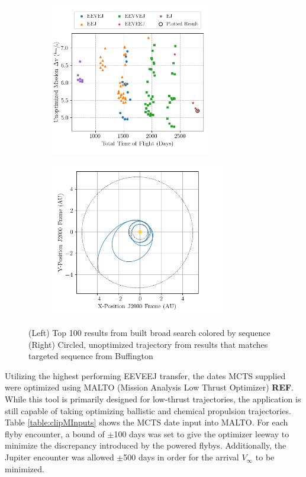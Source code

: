 \documentclass[letterpaper, preprint, paper,11pt]{AAS}	%
\begin{document}
\begin{figure}[htb]
    \begin{subfigure}
        \centering\includegraphics[width=2.75in]{./fig/clipperResults.png}
    \end{subfigure}
    \begin{subfigure}
        \centering\includegraphics[width=3in]{./fig/clipperMCTS.png}
    \end{subfigure}
    \caption{(Left) Top 100 results from built broad search colored by sequence\hspace{1em} (Right) Circled, unoptimized trajectory from results that matches targeted sequence from Buffington \cite{Buffington2014}}
    \label{fig:clipResults}
\end{figure}

Utilizing the highest performing EEVEEJ transfer, the dates MCTS supplied were optimized using MALTO (Mission Analysis Low Thrust Optimizer) \textbf{REF}. While this tool is primarily designed for low-thrust trajectories, the application is still capable of taking optimizing ballistic and chemical propulsion trajectories. Table \ref*{table:clipMInputs} shows the MCTS date input into MALTO. For each flyby encounter, a bound of $\pm$100 days was set to give the optimizer leeway to minimize the discrepancy introduced by the powered flybys. Additionally, the Jupiter encounter was allowed $\pm$500 days in order for the arrival $V_\infty$ to be minimized. 
\end{document}
